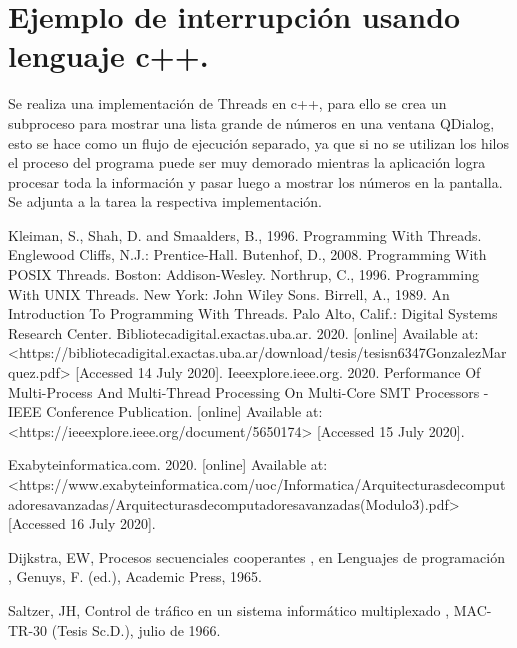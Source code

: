 \documentclass{article}
\begin{document}
\section{Ejemplo de interrupción usando lenguaje c++.} 
Se realiza una implementación de Threads en c++, para ello se crea un subproceso para mostrar una lista grande de números en una ventana QDialog, esto se hace como un flujo de ejecución separado, ya que si no se utilizan los hilos el proceso del programa puede ser muy demorado mientras la aplicación logra procesar toda la información y pasar luego a mostrar los números en la pantalla. 
Se adjunta a la tarea la respectiva implementación.

\begin{thebibliography}{0}
   Kleiman, S., Shah, D. and Smaalders, B., 1996. Programming With Threads. Englewood Cliffs, N.J.: Prentice-Hall.
   Butenhof, D., 2008. Programming With POSIX Threads. Boston: Addison-Wesley.
  Northrup, C., 1996. Programming With UNIX Threads. New York: John Wiley Sons.
  Birrell, A., 1989. An Introduction To Programming With Threads. Palo Alto, Calif.: Digital Systems Research Center.
   Bibliotecadigital.exactas.uba.ar. 2020. [online] Available at: <https://bibliotecadigital.exactas.uba.ar/download/tesis/tesisn6347GonzalezMarquez.pdf> [Accessed 14 July 2020].
  Ieeexplore.ieee.org. 2020. Performance Of Multi-Process And Multi-Thread Processing On Multi-Core SMT Processors - IEEE Conference Publication. [online] Available at: <https://ieeexplore.ieee.org/document/5650174> [Accessed 15 July 2020].
 
 Exabyteinformatica.com. 2020. [online] Available at: <https://www.exabyteinformatica.com/uoc/Informatica/Arquitecturasdecomputadoresavanzadas/Arquitecturasdecomputadoresavanzadas(Modulo3).pdf> [Accessed 16 July 2020].
 
  Dijkstra, EW, Procesos secuenciales cooperantes , en Lenguajes de programación , Genuys, F. (ed.), Academic Press, 1965.
 
 Saltzer, JH, Control de tráfico en un sistema informático multiplexado , MAC-TR-30 (Tesis Sc.D.), julio de 1966.
                           
\end{thebibliography}
\end{document}
